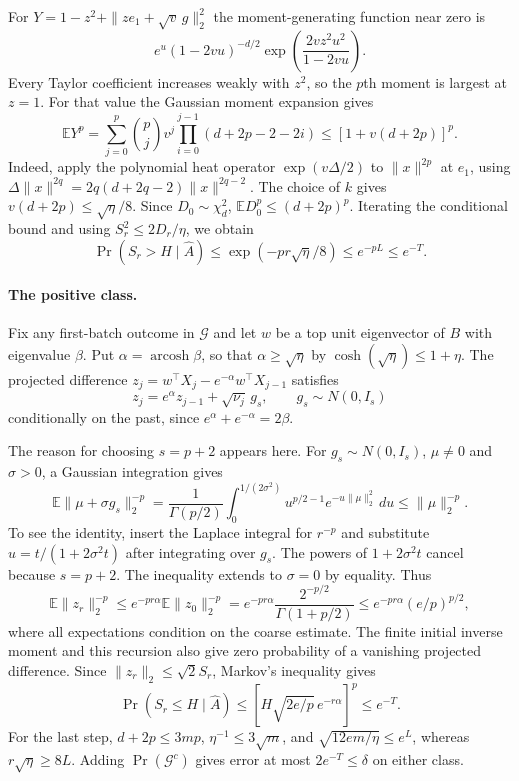 For \(Y=1-z^2+\|z e_1+\sqrt v\,g\|_2^2\) the moment-generating function near zero is
\[
 e^u(1-2vu)^{-d/2}\exp\!\left(\frac{2vz^2 u^2}{1-2vu}\right).
\]
Every Taylor coefficient increases weakly with \(z^2\), so the \(p\)th moment is largest at \(z=1\). For that value the Gaussian moment expansion gives
\[
 \mathbb E Y^p
 =\sum_{j=0}^p\binom{p}{j}v^j
      \prod_{i=0}^{j-1}(d+2p-2-2i)
 \le [1+v(d+2p)]^p.
\]
Indeed, apply the polynomial heat operator \(\exp(v\Delta/2)\) to \(\|x\|^{2p}\) at \(e_1\), using \(\Delta\|x\|^{2q}=2q(d+2q-2)\|x\|^{2q-2}\). The choice of \(k\) gives \(v(d+2p)\le\sqrt\eta/8\). Since \(D_0\sim\chi_d^2\), \(\mathbb E D_0^p\le(d+2p)^p\). Iterating the conditional bound and using \(S_r^2\le2D_r/\eta\), we obtain
\[
 \Pr(S_r>H\mid\widehat A)
 \le \exp(-pr\sqrt\eta/8)\le e^{-pL}\le e^{-T}.
\]

\paragraph{The positive class.}
Fix any first-batch outcome in \(\mathcal G\) and let \(w\) be a top unit eigenvector of \(B\) with eigenvalue \(\beta\). Put \(\alpha=\operatorname{arcosh}\beta\), so that \(\alpha\ge\sqrt\eta\) by \(\cosh(\sqrt\eta)\le1+\eta\). The projected difference \(z_j=w^\top X_j-e^{-\alpha}w^\top X_{j-1}\) satisfies
\[
 z_j=e^\alpha z_{j-1}+\sqrt{\nu_j}\,g_s,\qquad g_s\sim N(0,I_s)
\]
conditionally on the past, since \(e^\alpha+e^{-\alpha}=2\beta\).

The reason for choosing \(s=p+2\) appears here. For \(g_s\sim N(0,I_s)\), \(\mu\ne0\) and \(\sigma>0\), a Gaussian integration gives
\[
 \mathbb E\|\mu+\sigma g_s\|_2^{-p}
 =\frac{1}{\Gamma(p/2)}
    \int_0^{1/(2\sigma^2)}u^{p/2-1}e^{-u\|\mu\|_2^2}\,du
 \le \|\mu\|_2^{-p}.
\]
To see the identity, insert the Laplace integral for \(r^{-p}\) and substitute \(u=t/(1+2\sigma^2t)\) after integrating over \(g_s\). The powers of \(1+2\sigma^2t\) cancel because \(s=p+2\). The inequality extends to \(\sigma=0\) by equality. Thus
\[
 \mathbb E\|z_r\|_2^{-p}
 \le e^{-pr\alpha}\mathbb E\|z_0\|_2^{-p}
 =e^{-pr\alpha}\frac{2^{-p/2}}{\Gamma(1+p/2)}
 \le e^{-pr\alpha}(e/p)^{p/2},
\]
where all expectations condition on the coarse estimate. The finite initial inverse moment and this recursion also give zero probability of a vanishing projected difference. Since \(\|z_r\|_2\le\sqrt2 S_r\), Markov's inequality gives
\[
 \Pr(S_r\le H\mid\widehat A)
 \le [H\sqrt{2e/p}\,e^{-r\alpha}]^p \le e^{-T}.
\]
For the last step, \(d+2p\le3mp\), \(\eta^{-1}\le 3\sqrt m\), and
\(\sqrt{12em/\eta}\le e^L\), whereas \(r\sqrt\eta\ge8L\).
Adding \(\Pr(\mathcal G^c)\) gives error at most \(2e^{-T}\le\delta\) on either class.

